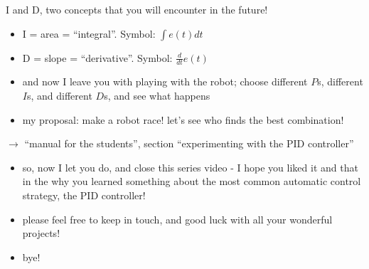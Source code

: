 \begin{frame}{I and D, two concepts that you will encounter in the future!}
	\pause
	\begin{itemize}
		\item I = area = ``integral''. \pause Symbol:
			$
				\int e(t) dt
			$
			\pause
			\vspace{0.5cm} 
		\item D = slope = ``derivative''. \pause Symbol:
			$
				\frac{d}{d t} e(t)
			$
	\end{itemize}
\end{frame}


\begin{frame}
	\begin{itemize}
		\item and now I leave you with playing with the robot; choose different $P$s, different $I$s, and different $D$s, and see what happens
		\item my proposal: make a robot race! let's see who finds the best combination!
	\end{itemize}
\end{frame}


\begin{frame}
	\begin{center}
		$\rightarrow$ ``manual for the students'', section ``experimenting with the PID controller''
	\end{center}
\end{frame}


\begin{frame}
	\begin{itemize}
		\item so, now I let you do, and close this series video - I hope you liked it and that in the why you learned something about the most common automatic control strategy, the PID controller!
		\item please feel free to keep in touch, and good luck with all your wonderful projects!
		\item bye!
	\end{itemize}
\end{frame}


